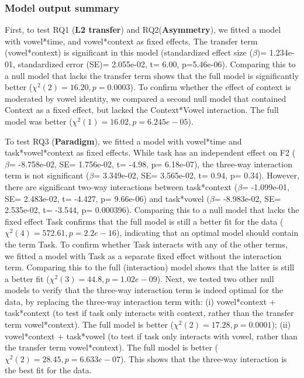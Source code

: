 \subsubsection*{Model output summary}

First, to test RQ1 (\textbf{L2 transfer}) and RQ2(\textbf{Asymmetry}), we fitted a model with vowel*time, and vowel*context as fixed effects. The transfer term (vowel*context) is significant in this model (standardized effect size ($\beta$)= 1.234e-01, standardized error (SE)=  2.055e-02, t= 6.00, p=5.46e-06). Comparing this to a null model that lacks the transfer term shows that the full model is significantly better ($\chi^2(2) = 16.20, p= 0.0003$). To confirm whether the effect of context is moderated by vowel identity, we compared a second null model that contained Context as a fixed effect, but lacked the Context*Vowel interaction. The full model was better ($\chi^2(1) = 16.02, p= 6.245e-05$).

To test RQ3 (\textbf{Paradigm}), we fitted a model with vowel*time and task*vowel*context as fixed effects. While task has an independent effect on F2 ($\beta$= -8.758e-02, SE= 1.756e-02, t= -4.98, p= 6.18e-07), the three-way interaction term is not significant ($\beta$= 3.349e-02, SE= 3.565e-02, t= 0.94, p= 0.34). However, there are significant two-way interactions between task*context ($\beta$= -1.099e-01, SE= 2.483e-02, t= -4.427, p= 9.66e-06) and task*vowel ($\beta$= -8.983e-02, SE= 2.535e-02, t= -3.544, p= 0.000396). Comparing this to a null model that lacks the fixed effect Task confirms that the full model is still a better fit for the data ($\chi^2(4) = 572.61, p=  2.2e-16$), indicating that an optimal model should contain the term Task. To confirm whether Task interacts with any of the other terms, we fitted a model with Task as a separate fixed effect without the interaction term. Comparing this to the full (interaction) model shows that the latter is still a better fit ($\chi^2(3) = 44.8, p= 1.02e-09$). Next, we tested two other null models to verify that the three-way interaction term is indeed optimal for the data, by replacing the three-way interaction term with: (i) vowel*context + task*context (to test if task only interacts with context, rather than the transfer term vowel*context). The full model is better ($\chi^2(2) = 17.28, p= 0.0001$); (ii) vowel*context + task*vowel (to test if task only interacts with vowel, rather than the transfer term vowel*context). The full model is better ($\chi^2(2) = 28.45, p= 6.633e-07$). This shows that the three-way interaction is the best fit for the data.

